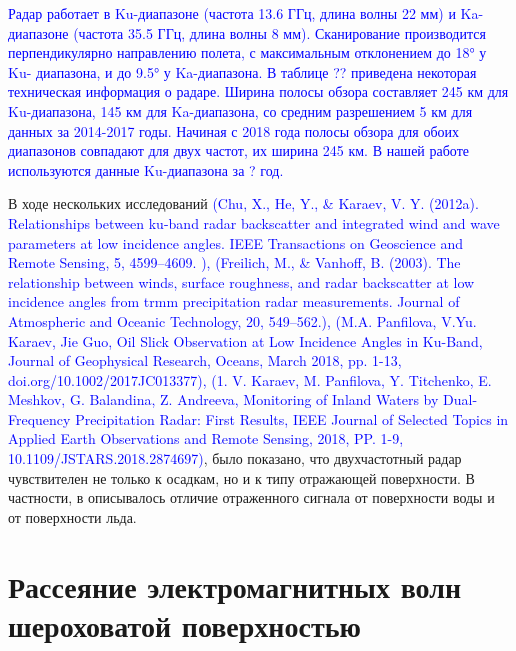 \textcolor{blue}{Радар работает в Ku-диапазоне (частота 13.6 ГГц, длина волны 22 мм) и Ka-диапазоне (частота 35.5 ГГц,
длина волны 8 мм). Сканирование производится перпендикулярно направлению
полета, с максимальным отклонением до 18° у Ku- диапазона, и до 9.5° у Ka-диапазона. В таблице ?? приведена некоторая
техническая информация о радаре.
Ширина полосы обзора составляет 245 км для Ku-диапазона, 145 км для Ka-диапазона, со средним разрешением 5 км для данных
за 2014-2017 годы. Начиная с 2018 года полосы обзора для обоих диапазонов совпадают для двух частот, их ширина 245 км. В
нашей работе используются данные Ku-диапазона за ? год.}   

В ходе нескольких исследований \textcolor{blue}{(Chu, X., He, Y., \& Karaev, V. Y. (2012a). Relationships between ku-band
radar backscatter and integrated wind and wave parameters at low incidence angles. IEEE Transactions on Geoscience and
Remote Sensing, 5, 4599–4609. ), (Freilich, M., \& Vanhoff, B.
(2003). The relationship between winds, surface roughness, and radar backscatter at low incidence angles from
trmm precipitation radar measurements. Journal of Atmospheric and Oceanic Technology, 20, 549–562.), (M.A. Panfilova,
V.Yu. Karaev, Jie Guo, Oil Slick Observation at Low Incidence Angles in Ku-Band, Journal of Geophysical Research,
Oceans, March 2018, pp. 1-13, doi.org/10.1002/2017JC013377), (1.	V. Karaev, M. Panfilova, Y. Titchenko, E. Meshkov, G.
Balandina, Z. Andreeva, Monitoring of Inland Waters by Dual-Frequency Precipitation Radar: First Results, IEEE Journal
of Selected Topics in Applied Earth Observations and Remote Sensing, 2018, PP. 1-9, 10.1109/JSTARS.2018.2874697)}, было
показано, что двухчастотный радар чувствителен не только к осадкам, но и к типу отражающей поверхности. В частности, в \cite{kar1} описывалось отличие
отраженного сигнала от поверхности воды и от поверхности льда.


\section{Рассеяние электромагнитных волн шероховатой поверхностью}
